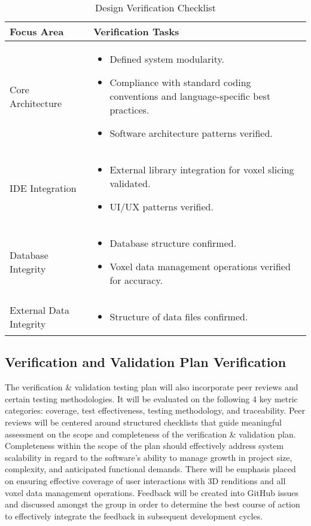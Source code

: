 \documentclass[12pt, titlepage]{article}
\begin{document}
\begin{table}[H]
\centering
\caption{Design Verification Checklist}
\renewcommand{\arraystretch}{1.3}
\setlength{\tabcolsep}{8pt}
\begin{tabular}{|p{}|p{}|}
\hline
\textbf{Focus Area} & \textbf{Verification Tasks} \\ \hline
Core Architecture &
\begin{itemize}
\item Defined system modularity.
\item Compliance with standard coding conventions and language-specific best practices.
\item Software architecture patterns verified.
\end{itemize} \\ \hline
IDE Integration &
\begin{itemize}
\item External library integration for voxel slicing validated.
\item UI/UX patterns verified.
\end{itemize} \\ \hline
Database Integrity &
\begin{itemize}
\item Database structure confirmed.
\item Voxel data management operations verified for accuracy.
\end{itemize} \\ \hline
External Data Integrity &
\begin{itemize}
\item Structure of data files confirmed.
\end{itemize} \\ \hline
\end{tabular}
\end{table}


\subsection{Verification and Validation Plan Verification}

The verification \& validation testing plan will also incorporate peer reviews and certain testing methodologies. It will be evaluated on the following 4 key metric categories: coverage, test effectiveness, testing methodology, and traceability. Peer reviews will be centered around structured checklists that guide meaningful assessment on the scope and completeness of the verification \& validation plan. Completeness within the scope of the plan should effectively address system scalability in regard to the software’s ability to manage growth in project size, complexity, and anticipated functional demands. There will be emphasis placed on ensuring effective coverage of user interactions with 3D renditions and all voxel data management operations. Feedback will be created into GitHub issues and discussed amongst the group in order to determine the best course of action to effectively integrate the feedback in subsequent development cycles.\\
\end{document}
